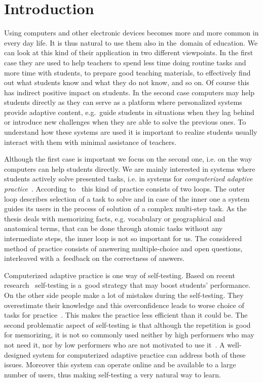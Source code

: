 \documentclass[table,color,cover,twoside,nolot,nolof]{fithesis3/fithesis3}
\begin{document}
\chapter{Introduction}

Using computers and other electronic devices becomes more and mo\-re common in
every day life. It is thus natural to use them also in the~domain of
education. We can look at this kind of their application in two different
viewpoints. In the first case they are used to help teachers to spend less
time doing routine tasks and more time with students, to prepare good teaching
materials, to effectively find out what students know and what they do not
know, and so on. Of course this has indirect positive impact on students. In
the second case computers may help students directly as they can serve as a
platform where personalized systems provide adaptive content, e.g.~guide
students in situations when they lag behind or introduce new challenges when
they are able to solve the previous ones. To understand how these systems are
used it is important to realize students usually interact with them with
minimal assistance of teachers.

Although the first case is important we focus on the second one, i.e. on the
way computers can help students directly. We are mainly interested in systems
where students actively solve presented tasks, i.e. in systems for
\emph{computerized adaptive practice}~\cite{klinkenberg2011computer}. According
to~\cite{vanlehn2006behavior} this kind of practice consists of two loops. The
outer loop describes selection of a task to solve and in case of the inner one
a system guides its users in the process of solution of a complex multi-step
task. As the thesis deals with memorizing facts, e.g. vocabulary or
geographical and anatomical terms, that can be done through atomic tasks
without any intermediate steps, the inner loop is not so important for us. The
considered method of practice consists of answering multiple-choice and open
questions, interleaved with a~feedback on the correctness of answers.

Computerized adaptive practice is one way of self-testing. Based on recent
research~\cite{bjork2013self} self-testing is a~good strategy that may boost
students' performance. On the other side people make a lot of mistakes during
the self-testing. They overestimate their knowledge and this overconfidence
leads to worse choice of tasks for
practice~\cite{bjork2013self,kornell2008optimising}. This makes the practice
less efficient than it could be. The second problematic aspect of self-testing
is that although the repetition is good for memorizing, it is not so commonly
used neither by high performers who may not need it, nor by low performers who
are not motivated to use it~\cite{bjork2013self}. A well-designed system for
computerized adaptive practice can address both of these issues. Moreover this
system can operate online and be available to a large number of users, thus
making self-testing a very natural way to learn.
\end{document}
